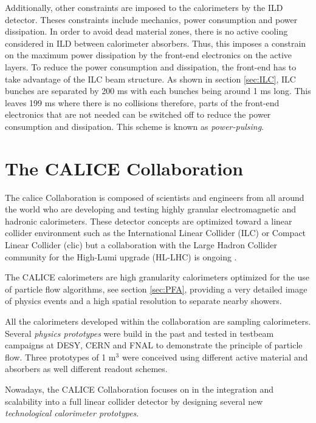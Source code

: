 Additionally, other constraints are imposed to the calorimeters by the ILD detector. Theses constraints include mechanics, power consumption and power dissipation. In order to avoid dead material zones, there is no active cooling considered in ILD between calorimeter absorbers. Thus, this imposes a constrain on the maximum power dissipation by the front-end electronics on the active layers. To reduce the power consumption and dissipation, the front-end has to take advantage of the ILC beam structure. As shown in section \ref{sec:ILC}, ILC bunches are separated by 200 ms with each bunches being around 1 ms long. This leaves 199 ms where there is no collisions therefore, parts of the front-end electronics that are not needed can be switched off to reduce the power consumption and dissipation. This scheme is known as \textit{power-pulsing}.

\section{The CALICE Collaboration}

The \acrshort{calice} Collaboration is composed of scientists and engineers from all around the world who are developing and testing highly granular electromagnetic and hadronic ca\-lo\-ri\-me\-ters. These detector concepts are optimized toward a linear collider environment such as the International Linear Collider (ILC) \cite{ILC_TDR_Vol1} or Compact Linear Collider (\acrshort{clic}) \cite{CLIC_CDR} but a collaboration with the Large Hadron Collider community for the High-Lumi upgrade (HL-LHC) is ongoing \cite{1748-0221-12-01-C01042}.

The CALICE calorimeters are high granularity calorimeters optimized for the use of particle flow algorithms, see section \ref{sec:PFA}, providing a very detailed image of physics events and a high spatial resolution to separate nearby showers.

All the calorimeters developed within the collaboration are sampling calorimeters. Several \textit{physics prototypes} were build in the past and tested in testbeam campaigns at DESY, CERN and FNAL \cite{1748-0221-3-08-P08001, 1748-0221-5-05-P05004, 1707.07126v2, 1748-0221-10-10-P10039, 1748-0221-3-05-P05001} to demonstrate the principle of particle flow. Three prototypes of 1 m$^3$ were conceived using different active material and absorbers as well different readout schemes.

Nowadays, the CALICE Collaboration focuses on in the integration and scalability into a full linear collider detector by designing several new \textit{technological calorimeter prototypes}.

